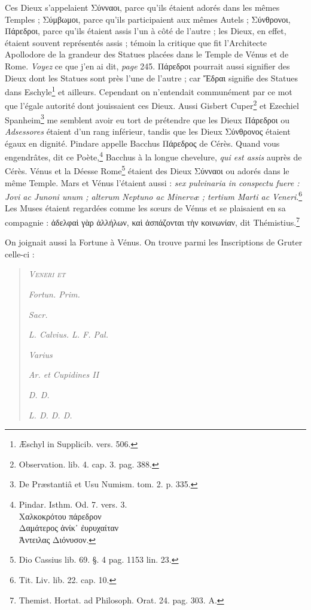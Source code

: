 \documentclass[a4paper, 11pt, oneside, polutonikogreek, french]{article}
\begin{document}
Ces Dieux s'appelaient Σύνναοι, parce qu'ils étaient adorés dans les mêmes Temples ; Σύμβωμοι, parce qu'ils participaient aux mêmes Autels ; Σύνθρονοι, Πάρεδροι, parce qu'ils étaient assis l'un à côté de l'autre ; les Dieux, en effet, étaient souvent représentés assis ; témoin la critique que fit l'Architecte Apollodore de la grandeur des Statues placées dans le Temple de Vénus et de Rome. \emph{Voyez} ce que j'en ai dit, \emph{page} 245. Πάρεδροι pourrait aussi signifier des Dieux dont les Statues sont près l'une de l'autre ; car Ἔδραι signifie des Statues dans Eschyle\footnote{Æschyl in Supplicib. vers. 506.} et ailleurs. Cependant on n'entendait communément par ce mot que l'égale autorité dont jouissaient ces Dieux. Aussi Gisbert Cuper\footnote{Observation. lib. 4. cap. 3. pag. 388.} et Ezechiel Spanheim\footnote{De Præstantiâ et Usu Numism. tom. 2. p. 335.} me semblent avoir eu tort de prétendre que les Dieux Πάρεδροι ou \emph{Adsessores} étaient d'un rang inférieur, tandis que les Dieux Σύνθρονος étaient égaux en dignité. Pindare appelle Bacchus Πάρεδρος de Cérès. Quand vous engendrâtes, dit ce Poète,\footnote{Pindar. Isthm. Od. 7. vers. 3.\\\hspace*{15mm}Χαλκοκρότου πάρεδρον\\\hspace*{5mm}Δαμάτερος ἁνίκ᾽ ἐυρυχαίταν\\\hspace*{5mm}Ἀντειλας Διόνυσον.} Bacchus à la longue chevelure, \emph{qui est assis} auprès de Cérès. Vénus et la Déesse Rome\footnote{Dio Cassius lib. 69. §. 4 pag. 1153 lin. 23.} étaient des Dieux Σύνναοι ou adorés dans le même Temple. Mars et Vénus l'étaient aussi : \emph{sex pulvinaria in conspectu fuere : Jovi ac Junoni unum ; alterum Neptuno ac Minervæ ; tertium Marti ac Veneri}.\footnote{Tit. Liv. lib. 22. cap. 10.} Les Muses étaient regardées comme les sœurs de Vénus et se plaisaient en sa compagnie : ἀδελφαὶ γὰρ ἀλλήλων, καὶ ἀσπάζονται τὴν κοινωνίαν, dit Thémistius.\footnote{Themist. Hortat. ad Philosoph. Orat. 24. pag. 303. A.}

On joignait aussi la Fortune à Vénus. On trouve parmi les Inscriptions de Gruter celle-ci :
\begin{quotation}
\scshape
\hspace*{5mm}\emph{Veneri et}

\emph{Fortun. Prim.}

\hspace*{15mm}\emph{Sacr.}

\emph{L. Calvius. L. F. Pal.}

\hspace*{15mm}\emph{Varius}

\emph{Ar. et Cupidines II}

\hspace*{15mm}\emph{D. D.}

\hspace*{5mm}\emph{L. D. D. D.}
\end{quotation}
\end{document}
